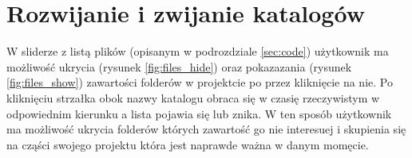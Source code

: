 \section{Rozwijanie i zwijanie katalogów}
W sliderze z listą plików (opisanym w podrozdziale \ref{sec:code}) użytkownik ma możliwość ukrycia (rysunek \ref{fig:files_hide}) oraz pokazazania (rysunek \ref{fig:files_show}) zawartości folderów w projektcie po przez kliknięcie na nie. Po kliknięciu strzałka obok nazwy katalogu obraca się w czasię rzeczywistym w odpowiednim kierunku a lista pojawia się lub znika.
\newline\newline
W ten sposób użytkownik ma możliwość ukrycia folderów których zawartość go nie interesuej i skupienia się na cząści swojego projektu która jest naprawde ważna w danym momęcie.

